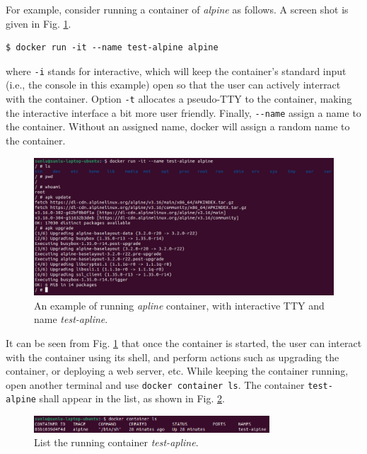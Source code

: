 For example, consider running a container of \textit{alpine} as follows. A screen shot is given in Fig. \ref{ch:vac:fig:dockerrunexp}.
\begin{lstlisting}
$ docker run -it --name test-alpine alpine
\end{lstlisting}
where \verb|-i| stands for interactive, which will keep the container's standard input (i.e., the console in this example) open so that the user can actively interract with the container. Option \verb|-t| allocates a pseudo-TTY to the container, making the interactive interface a bit more user friendly. Finally, \verb|--name| assign a name to the container. Without an assigned name, docker will assign a random name to the container.
\begin{figure}
	\centering
	\includegraphics[width=350pt]{chapters/ch-virtualization-and-containerization/figures/dockerrunexp.png}
	\caption{An example of running \textit{apline} container, with interactive TTY and name \textit{test-apline}.} \label{ch:vac:fig:dockerrunexp}
\end{figure}

It can be seen from Fig. \ref{ch:vac:fig:dockerrunexp} that once the container is started, the user can interact with the container using its shell, and perform actions such as upgrading the container, or deploying a web server, etc. While keeping the container running, open another terminal and use \verb|docker container ls|. The container \verb|test-alpine| shall appear in the list, as shown in Fig. \ref{ch:vac:fig:dockerrunexppart2}.
\begin{figure}
	\centering
	\includegraphics[width=250pt]{chapters/ch-virtualization-and-containerization/figures/dockerrunexppart2.png}
	\caption{List the running container \textit{test-apline}.} \label{ch:vac:fig:dockerrunexppart2}
\end{figure}

